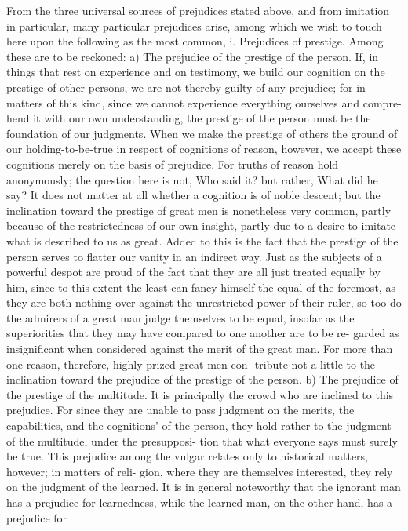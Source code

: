 From the three universal sources of prejudices stated above, and from
imitation in particular, many particular prejudices arise, among which we
wish to touch here upon the following as the most common,
i. Prejudices of prestige. Among these are to be reckoned:
a) The prejudice of the prestige of the person. If, in things that rest on
experience and on testimony, we build our cognition on the prestige of
other persons, we are not thereby guilty of any prejudice; for in matters of
this kind, since we cannot experience everything ourselves and compre-
hend it with our own understanding, the prestige of the person must be
the foundation of our judgments. When we make the prestige of others
the ground of our holding-to-be-true in respect of cognitions of reason,
however, we accept these cognitions merely on the basis of prejudice. For
truths of reason hold anonymously; the question here is not, Who said it?
but rather, What did he say? It does not matter at all whether a cognition is
of noble descent; but the inclination toward the prestige of great men is
nonetheless very common, partly because of the restrictedness of our own
insight, partly due to a desire to imitate what is described to us as great.
Added to this is the fact that the prestige of the person serves to flatter our
vanity in an indirect way. Just as the subjects of a powerful despot are
proud of the fact that they are all just treated equally by him, since to this
extent the least can fancy himself the equal of the foremost, as they are
both nothing over against the unrestricted power of their ruler, so too do
the admirers of a great man judge themselves to be equal, insofar as the
superiorities that they may have compared to one another are to be re-
garded as insignificant when considered against the merit of the great
man. For more than one reason, therefore, highly prized great men con-
tribute not a little to the inclination toward the prejudice of the prestige of
the person.
b) The prejudice of the prestige of the multitude. It is principally the crowd
who are inclined to this prejudice. For since they are unable to pass
judgment on the merits, the capabilities, and the cognitions' of the person,
they hold rather to the judgment of the multitude, under the presupposi-
tion that what everyone says must surely be true. This prejudice among
the vulgar relates only to historical matters, however; in matters of reli-
gion, where they are themselves interested, they rely on the judgment of
the learned.
It is in general noteworthy that the ignorant man has a prejudice for
learnedness, while the learned man, on the other hand, has a prejudice for
